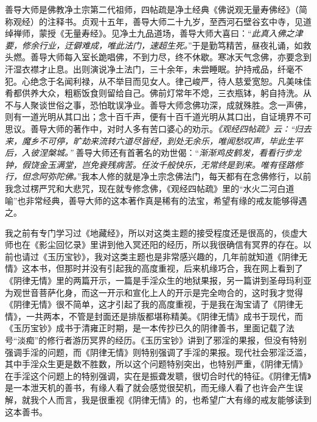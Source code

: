 \begin{book}
    善导大师是佛教净土宗第二代祖师，四帖疏是净土经典《佛说观无量寿佛经》（简称观经）的注释书。贞观十五年，善导大师二十九岁，至西河石壁谷玄中寺，见道绰禅师，蒙授《无量寿经》。见净土九品道场，善导大师大喜曰：“\textit{此真入佛之津要，修余行业，迂僻难成，唯此法门，速超生死。}”于是勤笃精苦，昼夜礼诵，如救头燃。善导大师每入室长跪唱佛，不到力尽，终不休歇。寒冰天气念佛，亦要念到汗湿衣襟才止息。出则演说净土法门，三十余年，未尝睡眠。护持戒品，纤毫不犯。心绝念于名闻利禄，从不举目而见女人。律己峻严，待人慈爱宽恕。凡美味佳肴都供养大众，粗粝饭食则留给自己。佛前灯常年不熄，三衣瓶钵，躬自持洗。从不与人聚谈世俗之事，恐怕耽误净业。善导大师念佛功深，成就殊胜。念一声佛，则有一道光明从其口出；念十百千声，便有十百千道光明从其口出，自证境界不可思议。善导大师的著作中，对时人多有苦口婆心的劝示。\textit{《观经四帖疏》云：“归去来，魔乡不可停，旷劫来流转六道尽皆经，到处无余乐，唯闻愁叹声，毕此生平后，入彼涅槃城。”} 善导大师还有首著名的劝世偈：“\textit{渐渐鸡皮鹤发，看看行步龙钟，假饶金玉满堂，岂免衰残病苦。任汝千般快乐，无常终是到来。唯有径路修行，但念阿弥陀佛。}”我本人修的就是净土宗念佛法门，每天都有在念佛修行，以前我念过楞严咒和大悲咒，现在就专修念佛，《观经四帖疏》里的“水火二河白道喻”也非常经典，善导大师的这本著作真是稀有的法宝，希望有缘的戒友能够得遇之。
\end{book}

\begin{book}
    我之前有专门学习过《地藏经》，所以对这类主题的接受程度还是很高的，倓虚大师也在《影尘回忆录》里讲到他入冥还阳的经历，所以我很确信有冥界的存在。以前也请过《玉历宝钞》，我对这类主题也是非常感兴趣的，几年前就知道《阴律无情》这本书，但那时并没有引起我的高度重视，后来机缘巧合，我在网上看到了《阴律无情》里的两篇开示，一篇是手淫众生的地狱果报，另一篇讲到圣母玛利亚为观世音菩萨化身，而这一开示和宣化上人的开示是完全吻合的，这时我才觉得《阴律无情》很不简单，这才引起了我的高度重视，于是我在淘宝请了《阴律无情》，一共两本，不管是封面还是排版都堪称精美。《阴律无情》成书于现代，而《玉历宝钞》成书于清雍正时期，是一本传抄已久的阴律善书，里面记载了法号“淡痴”的修行者游历冥界的经历。《玉历宝钞》讲到了邪淫的果报，但没有特别强调手淫的问题，而《阴律无情》则特别强调了手淫的果报。现代社会邪淫泛滥，其中手淫众生更是数不胜数，所以这个问题特别突出，也特别严重，《阴律无情》在手淫这个问题上的特别强调，实在是振聋发聩，很切合时代的特征。《阴律无情》是一本泄天机的善书，有缘人看了就会感觉很契机，而无缘人看了也许会产生误解，就我个人而言，我是很重视《阴律无情》的，也希望广大有缘的戒友能够读到这本善书。
\end{book}
